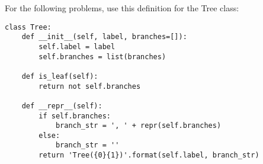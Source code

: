 For the following problems, use this definition for the Tree class:
\begin{lstlisting}
class Tree:
    def __init__(self, label, branches=[]):
        self.label = label
        self.branches = list(branches)

    def is_leaf(self):
        return not self.branches

    def __repr__(self):
        if self.branches:
            branch_str = ', ' + repr(self.branches)
        else:
            branch_str = ''
        return 'Tree({0}{1})'.format(self.label, branch_str)
\end{lstlisting}

